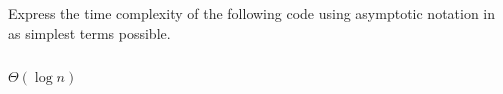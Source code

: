 \begin{prob}
    Express the time complexity of the following code using asymptotic
    notation in as simplest terms possible.

    \inputminted{python}{./code.py}

    \begin{soln}
        $\Theta(\log n)$
    \end{soln}

\end{prob}
